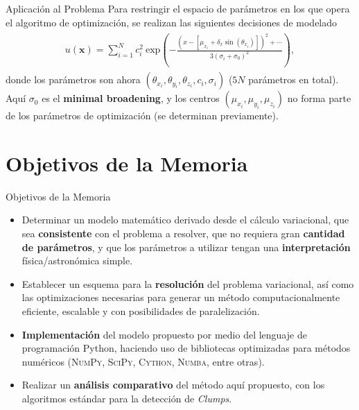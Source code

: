 \documentclass{beamer}
\begin{document}
\begin{frame}{Aplicación al Problema}
Para restringir el espacio de parámetros en los que opera el algoritmo de optimización, se realizan las siguientes decisiones de modelado
\begin{align*}
\begin{split}
u(\mathbf{x}) =  \sum_{i=1}^N c_i^2 \  \text{exp}\left(- \frac{(x - [\mu_{x_i} + \delta_x \sin(\theta_{x_i})])^2 + \cdots}{3 (\sigma_i + \sigma_0)^2} \right),
\end{split}
\end{align*}
donde los parámetros son ahora $(\theta_{x_i}, \theta_{y_i}, \theta_{z_i}, c_i, \sigma_i)$ ($5N$ parámetros en total). Aquí $\sigma_0$ es el \textbf{minimal broadening}, y los centros $(\mu_{x_i}, \mu_{y_i}, \mu_{z_i})$ no forma parte de los parámetros de optimización (se determinan previamente).
\end{frame}




\section{Objetivos de la Memoria}

\begin{frame}{Objetivos de la Memoria}
\begin{itemize}
  \item Determinar un modelo matemático derivado desde el cálculo variacional, que sea \textbf{consistente} con el problema a resolver, que no requiera gran \textbf{ cantidad de parámetros}, y que los parámetros a utilizar tengan una \textbf{interpretación} física/astronómica simple.
  \item Establecer un esquema para la \textbf{resolución} del problema variacional, así como las optimizaciones
  necesarias para generar un método computacionalmente eficiente, escalable y con posibilidades de
  paralelización.
  \item \textbf{Implementación} del modelo propuesto por medio del lenguaje de programación Python, haciendo uso de bibliotecas optimizadas para métodos numéricos (\textsc{NumPy, SciPy, Cython, Numba}, entre otras).
  \item Realizar un \textbf{análisis comparativo} del método aquí propuesto, con los algoritmos estándar para la detección de \textit{Clumps}.
\end{itemize}
\end{frame}
\end{document}
